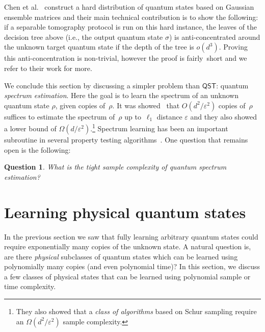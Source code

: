 \documentclass[11pt]{article}
\newtheorem{question}{Question}
\begin{document}
Chen et al.~\cite{chen2022tight} construct  a hard distribution of quantum states based on Gaussian ensemble matrices and   their main technical contribution is to show the following: if a separable tomography protocol is run on this hard instance, the leaves of the decision tree above (i.e., the output quantum state $\sigma$) is anti-concentrated around the unknown target quantum state if the depth of the tree is $o(d^3)$. Proving this anti-concentration is non-trivial, however the proof is fairly~short and we refer to their work for more.  

We conclude this section by discussing a simpler problem than $\textsf{QST}$:  quantum \emph{spectrum estimation}. Here the goal is to learn the spectrum of an unknown quantum state $\rho$, given copies of~$\rho$. It was showed~\cite{o2016efficient} that $O(d^2/\varepsilon^2)$ copies of~$\rho$ suffices to estimate the spectrum of~$\rho$ up to~$\ell_1$ distance $\varepsilon$ and they also showed a lower bound of $\Omega(d/\varepsilon^2)$.\footnote{They also showed that a \emph{class of algorithms} based on Schur sampling require an $\Omega(d^2/\varepsilon^2)$ sample complexity.} Spectrum learning has been an important subroutine in several property testing algorithms~\cite{o2015quantum,o2016efficient,wright2016learn,o2017efficient}. One question that remains open is the following:
\begin{question}
What is the tight sample complexity of quantum spectrum estimation?
\end{question}

\section{Learning physical quantum states}
\label{sec:physicalstates}
In the previous section we saw that fully learning arbitrary quantum states could require exponentially many copies of the unknown state. A natural question is, are there \emph{physical} subclasses of quantum states  which can be learned using polynomially many copies (and even polynomial time)? In this section, we discuss a few classes of physical states that can be learned using polynomial sample or time complexity. 
\end{document}
